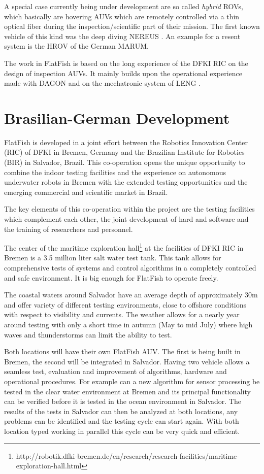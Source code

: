 \documentclass[conference]{IEEEtran}
\begin{document}
A special case currently being under development are so called \textit{hybrid} ROVs, which
basically are hovering AUVs which are remotely controlled via a thin optical fiber during
the inspection/scientific part of their mission. The first known vehicle of this kind was
the deep diving NEREUS \cite{bowen2009}. An example for a resent system is the HROV
\cite{meinecke2011} of the German MARUM.

The work in FlatFish is based on the long experience of the DFKI RIC on the design of
inspection AUVs. It mainly builds upon the operational experience made with DAGON
\cite{hildebrandt2012} and on the mechatronic system of LENG \cite{hildebrandt2013}.

\section{Brasilian-German Development}

FlatFish is developed in a joint effort between the Robotics Innovation Center (RIC) of
DFKI in Bremen, Germany and the Brazilian Institute for Robotics (BIR) in Salvador,
Brazil. This co-operation opens the unique opportunity to combine the indoor testing
facilities and the experience on autonomous underwater robots in Bremen with the 
extended
testing opportunities and the emerging commercial and scientific market in Brazil.

The key elements of this co-operation within the project are the testing facilities which
complement each other, the joint development of hard and software and the training of
researchers and personnel.

The center of the maritime exploration
hall\footnote{http://robotik.dfki-bremen.de/en/research/research-facilities/maritime-exploration-hall.html}
at the facilities of DFKI RIC in Bremen is a 3.5 million liter salt water test tank. This
tank allows for comprehensive tests of systems and control algorithms in a completely
controlled and safe environment. It is big enough for FlatFish to operate freely.

The coastal waters around Salvador have an average depth of approximately 30m and offer
variety of different testing environments, close to offshore conditions with respect to
visibility and currents. The weather  allows for a nearly year around testing with only a
short time in autumn (May to mid July) where high waves and thunderstorms can limit the
ability to test. 

Both locations will have their own FlatFish AUV. The first is being built in Bremen, the
second will be integrated in Salvador. Having two vehicle allows a seamless test,
evaluation and improvement of algorithms, hardware and operational procedures. For 
example
can a new algorithm for sensor processing be tested in the clear water environment at
Bremen and its principal functionality can be verified before it is tested in the ocean
environment in Salvador. The results of the tests in Salvador can then be analyzed at both
locations, any problems can be identified and the testing cycle can start again. With both
location typed working in parallel this cycle can be very quick and efficient.
\end{document}
